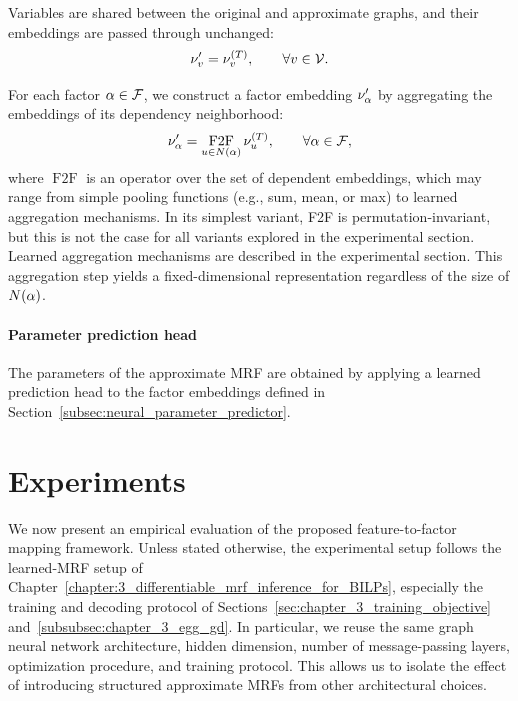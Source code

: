 Variables are shared between the original and approximate graphs, and their embeddings are passed through unchanged:
\begin{equation}
\nu'_v = \nu^{(T)}_v, \qquad \forall v \in \mathcal{V}.
\end{equation}

For each factor $\alpha \in \mathcal{F}$, we construct a factor embedding $\nu'_{\alpha}$ by aggregating the embeddings of its dependency neighborhood:
\begin{equation}
\nu'_{\alpha} =
\operatorname*{F2F}_{u \in N(\alpha)}
\nu^{(T)}_u,
\qquad \forall \alpha \in \mathcal{F},
\end{equation}
where $\operatorname*{F2F}$ is an operator over the set of dependent embeddings, which may range from simple pooling functions (e.g., sum, mean, or max) to learned aggregation mechanisms. In its simplest variant, F2F is permutation-invariant, but this is not the case for all variants explored in the experimental section. Learned aggregation mechanisms are described in the experimental section. This aggregation step yields a fixed-dimensional representation regardless of the size of $N(\alpha)$.

\paragraph{Parameter prediction head}
The parameters of the approximate MRF are obtained by applying a learned prediction head to the factor embeddings defined in Section~\ref{subsec:neural_parameter_predictor}.

\section{Experiments}
\label{sec:chapter_5_experiments}

We now present an empirical evaluation of the proposed feature-to-factor mapping framework. Unless stated otherwise, the experimental setup follows the learned-MRF setup of Chapter~\ref{chapter:3_differentiable_mrf_inference_for_BILPs}, especially the training and decoding protocol of Sections~\ref{sec:chapter_3_training_objective} and~\ref{subsubsec:chapter_3_egg_gd}. In particular, we reuse the same graph neural network architecture, hidden dimension, number of message-passing layers, optimization procedure, and training protocol. This allows us to isolate the effect of introducing structured approximate MRFs from other architectural choices.

